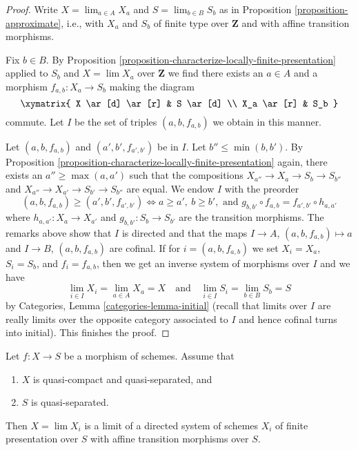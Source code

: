 \begin{proof}
Write $X = \lim_{a \in A} X_a$ and $S = \lim_{b \in B} S_b$ as in
Proposition \ref{proposition-approximate}, i.e., with $X_a$ and $S_b$
of finite type over $\mathbf{Z}$ and with affine transition morphisms.

\medskip\noindent
Fix $b \in B$.
By Proposition \ref{proposition-characterize-locally-finite-presentation}
applied to $S_b$ and $X = \lim X_a$ over $\mathbf{Z}$
we find there exists an $a \in A$ and a morphism
$f_{a, b} : X_a \to S_b$ making the diagram
$$
\xymatrix{
X \ar[d] \ar[r] & S \ar[d] \\
X_a \ar[r] & S_b
}
$$
commute. Let $I$ be the set of triples $(a, b, f_{a, b})$ we
obtain in this manner.

\medskip\noindent
Let $(a, b, f_{a, b})$ and $(a', b', f_{a', b'})$ be in $I$.
Let $b'' \leq \min(b, b')$. By
Proposition \ref{proposition-characterize-locally-finite-presentation}
again, there exists an $a'' \geq \max(a, a')$ such that
the compositions $X_{a''} \to X_a \to S_b \to S_{b''}$ and
$X_{a''} \to X_{a'} \to S_{b'} \to S_{b''}$ are equal.
We endow $I$ with the preorder
$$
(a, b, f_{a, b}) \geq (a', b', f_{a', b'})
\Leftrightarrow
a \geq a',\ b \geq b',\text{ and }
g_{b, b'} \circ f_{a, b} = f_{a', b'} \circ h_{a, a'}
$$
where $h_{a, a'} : X_a \to X_{a'}$ and $g_{b, b'} : S_b \to S_{b'}$
are the transition morphisms. The remarks above show that $I$
is directed and that the maps $I \to A$, $(a, b, f_{a, b}) \mapsto a$
and $I \to B$, $(a, b, f_{a, b})$ are cofinal. If for $i = (a, b, f_{a, b})$
we set $X_i = X_a$, $S_i = S_b$, and $f_i = f_{a, b}$, then we get
an inverse system of morphisms over $I$ and we have
$$
\lim_{i \in I} X_i = \lim_{a \in A} X_a = X
\quad\text{and}\quad
\lim_{i \in I} S_i = \lim_{b \in B} S_b = S
$$
by Categories, Lemma \ref{categories-lemma-initial} (recall that
limits over $I$ are really limits over the opposite category
associated to $I$ and hence cofinal turns into initial).
This finishes the proof.
\end{proof}

\begin{lemma}
\label{lemma-relative-approximation}
Let $f : X \to S$ be a morphism of schemes. Assume that
\begin{enumerate}
\item $X$ is quasi-compact and quasi-separated, and
\item $S$ is quasi-separated.
\end{enumerate}
Then $X = \lim X_i$ is a limit of a directed system of schemes
$X_i$ of finite presentation over $S$ with affine transition morphisms
over $S$.
\end{lemma}

